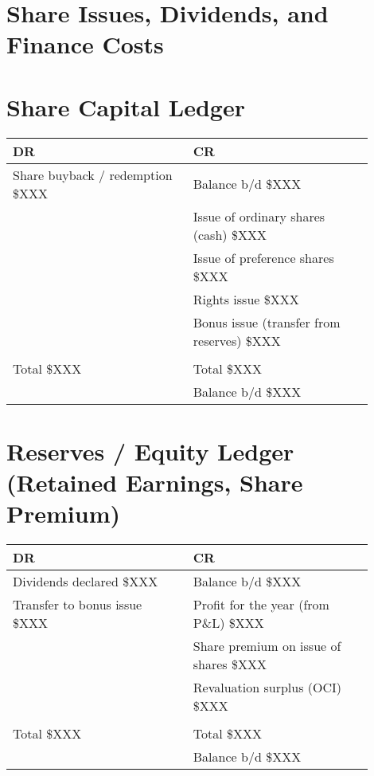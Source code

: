 \section*{Share Issues, Dividends, and Finance Costs}



\section*{Share Capital Ledger}

\begin{tabular}{@{}p{0.45\linewidth} p{0.45\linewidth}@{}}
\textbf{DR} & \textbf{CR} \\ \midrule
Share buyback / redemption \hfill \$XXX & Balance b/d \hfill \$XXX \\
& Issue of ordinary shares (cash) \hfill \$XXX \\
& Issue of preference shares \hfill \$XXX \\
& Rights issue \hfill \$XXX \\
& Bonus issue (transfer from reserves) \hfill \$XXX \\[3pt]
\multicolumn{2}{c}{\hrulefill} \\
Total \hfill \$XXX & Total \hfill \$XXX \\[6pt]
& Balance b/d \hfill \$XXX \\
\end{tabular}

\vspace{1cm}

\section*{Reserves / Equity Ledger (Retained Earnings, Share Premium)}

\begin{tabular}{@{}p{0.45\linewidth} p{0.45\linewidth}@{}}
\textbf{DR} & \textbf{CR} \\ \midrule
Dividends declared \hfill \$XXX & Balance b/d \hfill \$XXX \\
Transfer to bonus issue \hfill \$XXX & Profit for the year (from P\&L) \hfill \$XXX \\
& Share premium on issue of shares \hfill \$XXX \\
& Revaluation surplus (OCI) \hfill \$XXX \\[3pt]
\multicolumn{2}{c}{\hrulefill} \\
Total \hfill \$XXX & Total \hfill \$XXX \\[6pt]
& Balance b/d \hfill \$XXX \\
\end{tabular}

